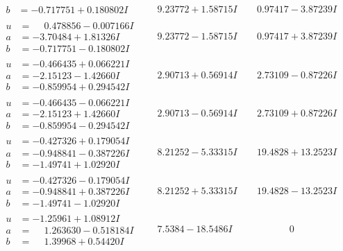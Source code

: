 \documentclass[1p]{elsarticle_modified}
\theoremstyle{definition}
\begin{document}
$$\begin{array}{c|c|c}
\begin{aligned}
b &= -0.717751 + 0.180802 I\end{aligned}
 & \phantom{-}9.23772 + 1.58715 I & \phantom{-}0.97417 - 3.87239 I \\ \hline\begin{aligned}
u &= \phantom{-}0.478856 - 0.007166 I \\
a &= -3.70484 + 1.81326 I \\
b &= -0.717751 - 0.180802 I\end{aligned}
 & \phantom{-}9.23772 - 1.58715 I & \phantom{-}0.97417 + 3.87239 I \\ \hline\begin{aligned}
u &= -0.466435 + 0.066221 I \\
a &= -2.15123 - 1.42660 I \\
b &= -0.859954 + 0.294542 I\end{aligned}
 & \phantom{-}2.90713 + 0.56914 I & \phantom{-}2.73109 - 0.87226 I \\ \hline\begin{aligned}
u &= -0.466435 - 0.066221 I \\
a &= -2.15123 + 1.42660 I \\
b &= -0.859954 - 0.294542 I\end{aligned}
 & \phantom{-}2.90713 - 0.56914 I & \phantom{-}2.73109 + 0.87226 I \\ \hline\begin{aligned}
u &= -0.427326 + 0.179054 I \\
a &= -0.948841 - 0.387226 I \\
b &= -1.49741 + 1.02920 I\end{aligned}
 & \phantom{-}8.21252 - 5.33315 I & \phantom{-}19.4828 + 13.2523 I \\ \hline\begin{aligned}
u &= -0.427326 - 0.179054 I \\
a &= -0.948841 + 0.387226 I \\
b &= -1.49741 - 1.02920 I\end{aligned}
 & \phantom{-}8.21252 + 5.33315 I & \phantom{-}19.4828 - 13.2523 I \\ \hline\begin{aligned}
u &= -1.25961 + 1.08912 I \\
a &= \phantom{-}1.263630 - 0.518184 I \\
b &= \phantom{-}1.39968 + 0.54420 I\end{aligned}
 & \phantom{-}7.5384 - 18.5486 I & \phantom{-0.000000 } 0 \\ \hline\begin{aligned}

\end{aligned}
\end{array}$$
\end{document}
